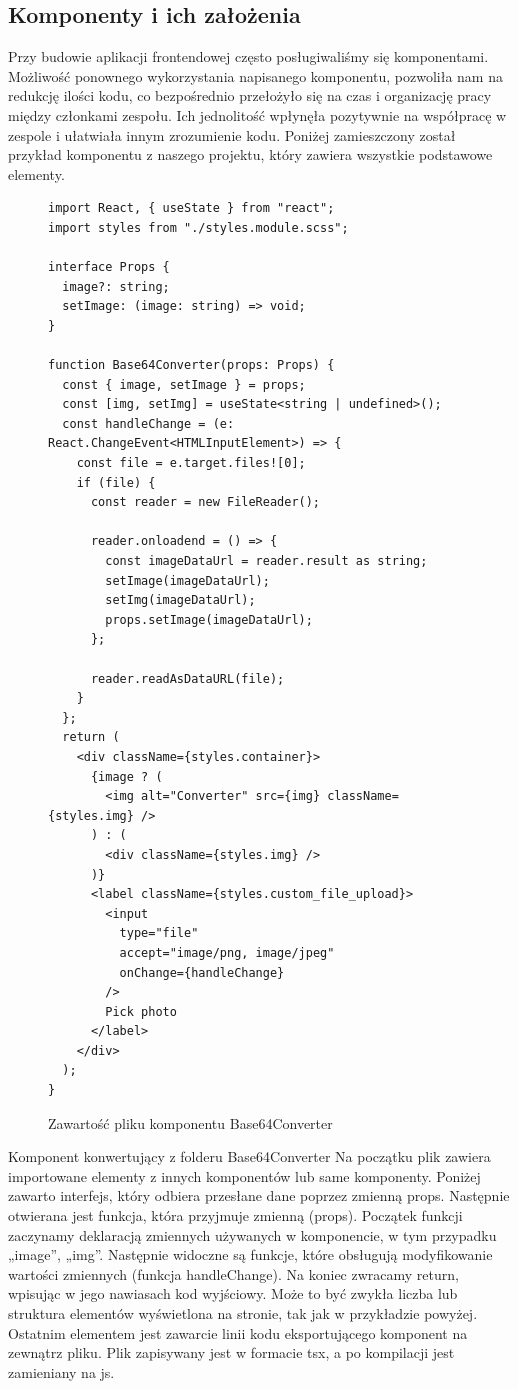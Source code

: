 \documentclass[a4paper,twoside,12pt]{book}
\begin{document}
\subsection{Komponenty i ich założenia}
Przy budowie aplikacji frontendowej często posługiwaliśmy się komponentami. Możliwość ponownego wykorzystania napisanego komponentu, pozwoliła nam na redukcję ilości kodu, co bezpośrednio przełożyło się na czas i organizację pracy między członkami zespołu. Ich jednolitość wpłynęła pozytywnie na współpracę w zespole i ułatwiała innym zrozumienie kodu. Poniżej zamieszczony został przykład komponentu z naszego projektu, który zawiera wszystkie podstawowe elementy.
\newpage
\begin{figure}[H]
        \begin{lstlisting}
import React, { useState } from "react";
import styles from "./styles.module.scss";

interface Props {
  image?: string;
  setImage: (image: string) => void;
}

function Base64Converter(props: Props) {
  const { image, setImage } = props;
  const [img, setImg] = useState<string | undefined>();
  const handleChange = (e: React.ChangeEvent<HTMLInputElement>) => {
    const file = e.target.files![0];
    if (file) {
      const reader = new FileReader();

      reader.onloadend = () => {
        const imageDataUrl = reader.result as string;
        setImage(imageDataUrl);
        setImg(imageDataUrl);
        props.setImage(imageDataUrl);
      };

      reader.readAsDataURL(file);
    }
  };
  return (
    <div className={styles.container}>
      {image ? (
        <img alt="Converter" src={img} className={styles.img} />
      ) : (
        <div className={styles.img} />
      )}
      <label className={styles.custom_file_upload}>
        <input
          type="file"
          accept="image/png, image/jpeg"
          onChange={handleChange}
        />
        Pick photo
      </label>
    </div>
  );
}

        \end{lstlisting}
    \caption{Zawartość pliku komponentu Base64Converter}
    \label{fig:pseudokod:listings}
\end{figure}
Komponent konwertujący z folderu Base64Converter
Na początku plik zawiera importowane elementy z innych komponentów lub same komponenty. Poniżej zawarto interfejs, który odbiera przesłane dane poprzez zmienną props. Następnie otwierana jest funkcja, która przyjmuje zmienną (props). Początek funkcji zaczynamy deklaracją zmiennych używanych w komponencie, w tym przypadku „image”, „img”. Następnie widoczne są funkcje, które obsługują modyfikowanie wartości zmiennych (funkcja handleChange). Na koniec zwracamy return, wpisując w jego nawiasach kod wyjściowy. Może to być zwykła liczba lub struktura elementów wyświetlona na stronie, tak jak w przykładzie powyżej. Ostatnim elementem jest zawarcie linii kodu eksportującego komponent na zewnątrz pliku. Plik zapisywany jest w formacie tsx, a po kompilacji jest zamieniany na js.
\end{document}
